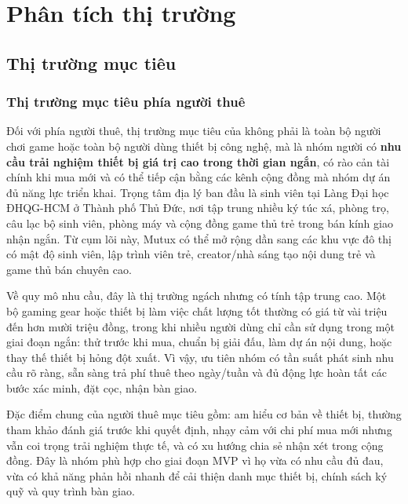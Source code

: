 \section{Phân tích thị trường}


\subsection{Thị trường mục tiêu}

\subsubsection{Thị trường mục tiêu phía người thuê}

Đối với phía người thuê, thị trường mục tiêu của \projectname{} không phải là toàn bộ người chơi game hoặc toàn bộ người dùng thiết bị công nghệ, mà là nhóm người có \textbf{nhu cầu trải nghiệm thiết bị giá trị cao trong thời gian ngắn}, có rào cản tài chính khi mua mới và có thể tiếp cận bằng các kênh cộng đồng mà nhóm dự án đủ năng lực triển khai. Trọng tâm địa lý ban đầu là sinh viên tại Làng Đại học ĐHQG-HCM ở Thành phố Thủ Đức, nơi tập trung nhiều ký túc xá, phòng trọ, câu lạc bộ sinh viên, phòng máy và cộng đồng game thủ trẻ trong bán kính giao nhận ngắn. Từ cụm lõi này, Mutux có thể mở rộng dần sang các khu vực đô thị có mật độ sinh viên, lập trình viên trẻ, creator/nhà sáng tạo nội dung trẻ và game thủ bán chuyên cao.

Về quy mô nhu cầu, đây là thị trường ngách nhưng có tính tập trung cao. Một bộ gaming gear hoặc thiết bị làm việc chất lượng tốt thường có giá từ vài triệu đến hơn mười triệu đồng, trong khi nhiều người dùng chỉ cần sử dụng trong một giai đoạn ngắn: thử trước khi mua, chuẩn bị giải đấu, làm dự án nội dung, hoặc thay thế thiết bị hỏng đột xuất. Vì vậy, \projectname{} ưu tiên nhóm có tần suất phát sinh nhu cầu rõ ràng, sẵn sàng trả phí thuê theo ngày/tuần và đủ động lực hoàn tất các bước xác minh, đặt cọc, nhận bàn giao.

Đặc điểm chung của người thuê mục tiêu gồm: am hiểu cơ bản về thiết bị, thường tham khảo đánh giá trước khi quyết định, nhạy cảm với chi phí mua mới nhưng vẫn coi trọng trải nghiệm thực tế, và có xu hướng chia sẻ nhận xét trong cộng đồng. Đây là nhóm phù hợp cho giai đoạn MVP vì họ vừa có nhu cầu đủ đau, vừa có khả năng phản hồi nhanh để \projectname{} cải thiện danh mục thiết bị, chính sách ký quỹ và quy trình bàn giao.

